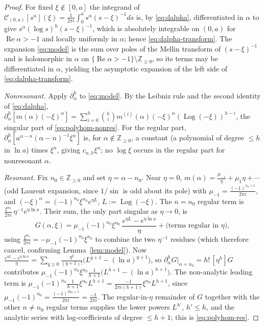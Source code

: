 \documentclass[pdflatex,sn-mathphys-num]{sn-jnl}%
\newcommand{\Z}{\mathbb{Z}}
\newcommand{\Cau}{\mathcal{C}}
\newcommand{\Real}{\operatorname{Re}}
\newcommand{\Log}{\operatorname{Log}}
\theoremstyle{thmstyleone}
\theoremstyle{thmstyletwo}
\theoremstyle{thmstylethree}
\begin{document}
\begin{proof}
For fixed $\xi\notin[0,a]$ the integrand of
$\Cau_{(0,a)}[s^{\alpha}](\xi)=\frac{1}{2\pi i}\int_0^a s^{\alpha}(s-\xi)^{-1}ds$
is, by \eqref{eq:dalpha}, differentiated in $\alpha$ to give
$s^{\alpha}(\log s)^{h}(s-\xi)^{-1}$, which is absolutely integrable on $(0,a)$
for $\Real\alpha>-1$ and locally uniformly in $\alpha$; hence
\eqref{eq:dalpha-transform}. The expansion \eqref{eq:model} is the sum over poles
of the Mellin transform of $(s-\xi)^{-1}$ and is holomorphic in $\alpha$ on
$\{\Real\alpha>-1\}\setminus\Z_{\ge0}$, so its terms may be differentiated in
$\alpha$, yielding the asymptotic expansion of the left side of
\eqref{eq:dalpha-transform}.

\emph{Nonresonant.} Apply $\partial_\alpha^{h}$ to \eqref{eq:model}. By the
Leibniz rule and the second identity of \eqref{eq:dalpha},
$\partial_\alpha^{h}[m(\alpha)(-\xi)^{\alpha}]
=\sum_{i=0}^{h}\binom{h}{i}m^{(i)}(\alpha)(-\xi)^{\alpha}(\Log(-\xi))^{h-i}$,
the singular part of \eqref{eq:polyhom-nonres}. 
For the regular part,
$\partial_\alpha^{h}[a^{\alpha-n}(\alpha-n)^{-1}\xi^{n}]$ is, for
$\alpha\notin\Z_{\ge0}$, a constant (a polynomial of degree $\le h$ in $\ln a$)
times $\xi^{n}$, giving $c_{n,h}\xi^{n}$; no $\log\xi$ occurs in the regular
part for nonresonant $\alpha$.

\emph{Resonant.} Fix $n_0\in\Z_{\ge0}$ and set $\eta=\alpha-n_0$. Near $\eta=0$,
$m(\alpha)=\frac{\mu_{-1}}{\eta}+\mu_1\eta+\cdots$ (odd Laurent expansion, since
$1/\sin$ is odd about its pole) with $\mu_{-1}=\frac{(-1)^{n_0+1}}{2\pi i}$, and
$(-\xi)^{\alpha}=(-1)^{n_0}\xi^{n_0}e^{\eta L}$, $L:=\Log(-\xi)$. The $n=n_0$
regular term is $\frac{\xi^{n_0}}{2\pi i}\,\eta^{-1}e^{\eta\ln a}$. Their sum,
the only part singular as $\eta\to0$, is
\[
  G(\alpha,\xi)
  =\mu_{-1}(-1)^{n_0}\xi^{n_0}\,\frac{e^{\eta L}-e^{\eta\ln a}}{\eta}
   +\bigl(\text{terms regular in }\eta\bigr),
\]
using $\frac{\xi^{n_0}}{2\pi i}=-\mu_{-1}(-1)^{n_0}\xi^{n_0}$ to combine the two
$\eta^{-1}$ residues (which therefore cancel, confirming
Lemma~\ref{lem:model}). 
Now
$\frac{e^{\eta L}-e^{\eta\ln a}}{\eta}=\sum_{q\ge0}\frac{\eta^{q}}{(q+1)!}
\bigl(L^{q+1}-(\ln a)^{q+1}\bigr)$, so
$\partial_\alpha^{h}G|_{\alpha=n_0}=h!\,[\eta^{h}]G$ contributes
$\mu_{-1}(-1)^{n_0}\xi^{n_0}\frac{1}{h+1}\bigl(L^{h+1}-(\ln a)^{h+1}\bigr)$. The
non-analytic leading term is
$\mu_{-1}(-1)^{n_0}\frac{1}{h+1}\xi^{n_0}L^{h+1}
=\frac{-1}{2\pi i(h+1)}\xi^{n_0}L^{h+1}$, since
$\mu_{-1}(-1)^{n_0}=\frac{(-1)^{2n_0+1}}{2\pi i}=\frac{-1}{2\pi i}$. The
regular-in-$\eta$ remainder of $G$ together with the other $n\neq n_0$ regular
terms supplies the lower powers $L^{h'}$, $h'\le h$, and the analytic series with
log-coefficients of degree $\le h+1$; this is \eqref{eq:polyhom-res}.
\end{proof}
\end{document}
